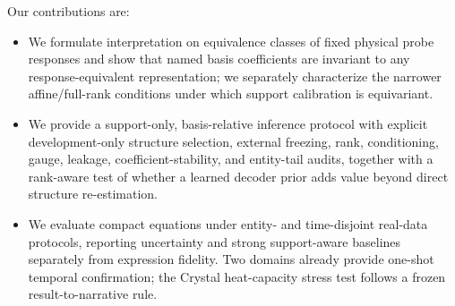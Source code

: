 Our contributions are:
\begin{itemize}
  \item We formulate interpretation on equivalence classes of fixed physical
  probe responses and show that named basis coefficients are invariant to any
  response-equivalent representation; we separately characterize the narrower
  affine/full-rank conditions under which support calibration is equivariant.
  \item We provide a support-only, basis-relative inference protocol with explicit
  development-only structure selection, external freezing, rank, conditioning,
  gauge, leakage, coefficient-stability, and entity-tail audits, together with a
  rank-aware test of whether a learned decoder prior adds value beyond direct
  structure re-estimation.
  \item We evaluate compact equations under entity- and time-disjoint real-data
  protocols, reporting uncertainty and strong support-aware baselines separately
  from expression fidelity.  Two domains already provide one-shot temporal
  confirmation; the Crystal heat-capacity stress test follows a frozen
  result-to-narrative rule.
\end{itemize}

